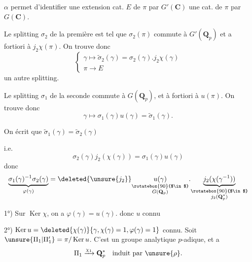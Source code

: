 
 $\alpha$ permet d'identifier une extension cat.  $E$ de $\pi$ par $G'(\mathbf C)$  une  cat. de $\pi$ par $G(\mathbf C)$.

Le splitting $\sigma_2$ de la première est tel que $\sigma_2(\pi)$ commute à $G'(\mathbf Q_p)$ et a fortiori à $j_2\chi(\pi)$. On trouve donc
\[
\left\{\begin{array}{l}
\gamma\longmapsto\widetilde\sigma_2(\gamma)=\sigma_2(\gamma).j_2\chi(\gamma)\\
\pi\longrightarrow E
\end{array}\right.
\]
un autre splitting.

Le splitting $\sigma_1$ de la seconde commute à $G(\mathbf Q_p)$, et à fortiori à $u(\pi)$. On trouve donc
\[
\gamma\longmapsto\sigma_1(\gamma)u(\gamma)=\widetilde\sigma_1(\gamma).
\]

On écrit que $\widetilde\sigma_1(\gamma)=\widetilde\sigma_2(\gamma)$

i.e.
\[
\sigma_2(\gamma)j_2(\chi(\gamma))=\sigma_1(\gamma)u(\gamma)
\]
donc
\[
\underbrace{\sigma_1(\gamma)^{-1}\sigma_2(\gamma)}_{\varphi(\gamma)}
=\deleted{\unsure{j_2}}\underset{\substack{\rotatebox{90}{$\in$}\\G(\mathbf Q_p)}}{u(\gamma)}.
\underset{\substack{\rotatebox{90}{$\in$}\\j_2(\mathbf Q_p^*)}}{\underbrace{j_2(\chi(\gamma^{-1}))}}
\]

1°) Sur $\operatorname{Ker}\chi$, on a $\varphi(\gamma)=u(\gamma)$. donc $u$ connu  

2°) $\operatorname{Ker}u=\deleted{\chi(\gamma)}\{\gamma,\chi(\gamma)=1,\varphi(\gamma)=1\}$ connu. Soit $\unsure{\Pi_1|\Pi'_1}=\pi/\operatorname{Ker}u$. C'est un groupe analytique $p$-adique, et a
\[
\Pi_1\xrightarrow{\chi_1}\mathbf Q_p^*\quad\text{induit par }\unsure{\rho}.
\]
